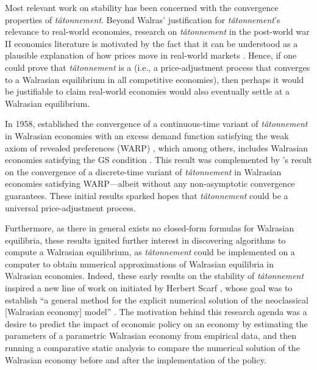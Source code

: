 Most relevant work on stability has been concerned with the convergence properties of \emph{t\^atonnement}.
Beyond Walras' justification for \emph{t\^atonnement}'s relevance to real-world economies, research on \emph{t\^atonnement} in the post-world war II economics literature is motivated by the fact that it can be understood as a plausible explanation of how prices move in real-world markets \cite{gillen2020divergence}. Hence, if one could prove that \emph{t\^atonnement\/} is a  (i.e., a price-adjustment process that converges to a Walrasian equilibrium in all competitive economies), then perhaps it would be justifiable to claim real-world economies would also eventually settle at a Walrasian equilibrium.

In 1958, \citet{arrow-hurwicz} 
established the convergence of a continuous-time variant of \emph{t\^atonnement\/} in Walrasian economies with an excess demand function satisfying the weak axiom of revealed preferences (WARP) \cite{afriat1967construction}, which among others, includes Walrasian economies satisfying the GS condition \cite{arrow1959stability, arrow1960competitive}. This result was complemented by \citeauthor{nikaido1960stability}'s \cite{nikaido1960stability} result on the convergence of a discrete-time variant of \emph{t\^atonnement\/} in Walrasian economies satisfying WARP---albeit without any non-asymptotic convergence guarantees. These initial results sparked hopes that \emph{t\^atonnement\/} could be a universal price-adjustment process.

Furthermore, as there in general exists no closed-form formulas for Walrasian equilibria, these results ignited further interest in discovering algorithms to compute a Walrasian equilibrium, as \emph{t\^atonnement} could be implemented on a computer to obtain numerical approximations of Walrasian equilibria in Walrasian economies.
Indeed, these early results on the stability of \emph{t\^atonnement} inspired a new line of work on  \cite{scarf1967computation, scarf1967approximation, scarf1973book, scarf1982computation} initiated by Herbert Scarf \cite{scarf-eaves}, whose goal was to establish ``a general method for the explicit numerical solution of the neoclassical [Walrasian economy] model'' \cite{scarf1973book}. The motivation behind this research agenda was a desire to predict the impact of economic policy on an economy by estimating the parameters of a parametric Walrasian economy from empirical data, and then running a comparative static analysis to compare the numerical solution of the Walrasian economy before and after the implementation of the policy.

